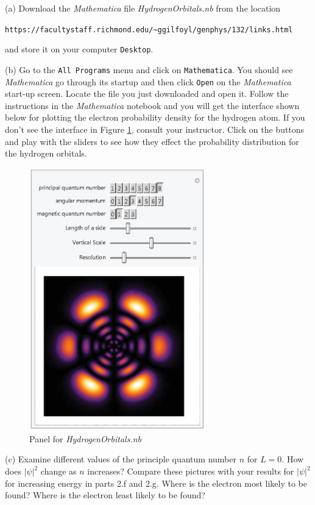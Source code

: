 (a) Download the {\it Mathematica} file {\it HydrogenOrbitals.nb} from the location

\begin{center}
{\verb!https://facultystaff.richmond.edu/~ggilfoyl/genphys/132/links.html!}
\end{center}
\noindent and store it on your computer {\tt Desktop}.

(b) Go to the {\tt All Programs} menu and click on {\tt Mathematica}.
You should see {\it Mathematica} go through its startup and then click {\tt Open}
on the {\it Mathematica} start-up screen.
Locate the file you just downloaded and open it.
Follow the instructions in the {\it Mathematica} notebook
and you will get the interface shown below for plotting
the electron probability density for the hydrogen atom.
If you don't see the interface in Figure \ref{fig:gui}, consult your instructor.
Click on the buttons and play with the sliders to see how they effect the 
probability distribution for the hydrogen orbitals.
\begin{figure}[h!]
\begin{center}
\includegraphics[width=3.0in]{qmProbability/HydrogenOrbitals132.eps}
\caption{Panel for {\it HydrogenOrbitals.nb}}\label{fig:gui}
\end{center}
\end{figure}

(c) Examine different values of the principle quantum number $n$ for $L=0$.
How does $|\psi|^2$ change as $n$ increases? Compare these pictures with your results for 
$|\psi|^2$ for increasing energy in parts 2.f and 2.g.
Where is the electron most likely to be found?
Where is the electron least likely to be found?
\vspace{3.0cm}


